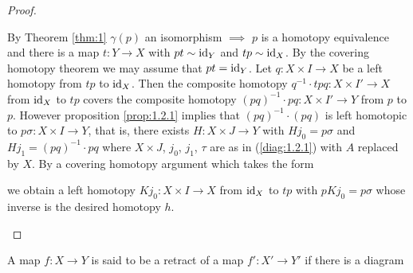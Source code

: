 \documentclass[../main]{subfiles}
\begin{document}
\begin{proof}
\begin{implyenumerate}
\item[(iii) $\implies$ (ii)]By Theorem \ref{thm:1} $\gamma(p)$ an isomorphism $\implies$ $p$ is a homotopy equivalence and there is a map $t : Y \longrightarrow X$ with $pt \sim \operatorname{id}_Y$ and $tp \sim \operatorname{id}_X$. By the covering homotopy theorem we may assume that $pt = \operatorname{id}_Y$. Let $q : X \times I \longrightarrow X$ be a left homotopy from $tp$ to $\operatorname{id}_X$. Then the composite homotopy $q^{-1} \cdot tpq : X \times I' \longrightarrow X$ from $\operatorname{id}_X$ to $tp$ covers the composite homotopy $(pq)^{-1} \cdot pq : X \times I' \longrightarrow Y$ from $p$ to $p$. However proposition \ref{prop:1.2.1} implies that $(pq)^{-1} \cdot (pq)$ is left homotopic to $p\sigma : X \times I \longrightarrow Y$, that is, there exists $H : X \times J \longrightarrow Y$ with $H j_0 = p\sigma$ and $H j_1 = (pq)^{-1} \cdot pq$ where $X \times J$, $j_0$, $j_1$, $\tau$ are as in (\ref{diag:1.2.1}) with $A$ replaced by $X$. By a covering homotopy argument which takes the form

\begin{center}
\end{center} 

we obtain a left homotopy $K j_0 : X \times I \longrightarrow X$ from $\operatorname{id}_X$ to $tp$ with $p Kj_0 = p\sigma$ whose inverse is the desired homotopy $h$.
\end{implyenumerate}

\end{proof}

\begin{definition*}
A map $f \colon X \longrightarrow Y$ is said to be a retract of a map $f' : X' \longrightarrow Y'$ if there is a diagram

\begin{center}
\end{center}
\end{definition*} 
\end{document}
